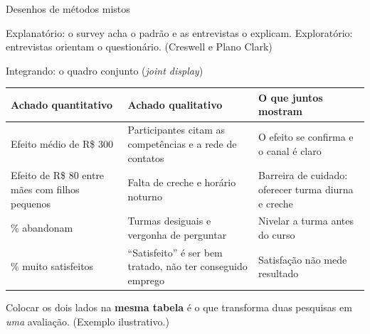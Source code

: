 \begin{frame}{Desenhos de métodos mistos}
  \centering
  \vspace{0.2cm}\par
  \footnotesize Explanatório: o survey acha o padrão e as entrevistas o explicam. Exploratório: entrevistas orientam o questionário. (Creswell e Plano Clark)
\end{frame}

\begin{frame}{Integrando: o quadro conjunto (\textit{joint display})}
  \scriptsize
  \renewcommand{\arraystretch}{1.3}
  \begin{tabularx}{\textwidth}{@{}>{\raggedright\arraybackslash}p{2.6cm}>{\raggedright\arraybackslash}X>{\raggedright\arraybackslash}X@{}}
    \toprule
    \textbf{Achado quantitativo} & \textbf{Achado qualitativo} & \textbf{O que juntos mostram} \\ \midrule
    Efeito médio de R\$ 300 & Participantes citam as competências e a rede de contatos & O efeito se confirma e o canal é claro \\
    Efeito de R\$ 80 entre mães com filhos pequenos & Falta de creche e horário noturno & Barreira de cuidado: oferecer turma diurna e creche \\
    35\% abandonam & Turmas desiguais e vergonha de perguntar & Nivelar a turma antes do curso \\
    80\% muito satisfeitos & ``Satisfeito'' é ser bem tratado, não ter conseguido emprego & Satisfação não mede resultado \\ \bottomrule
  \end{tabularx}
  \vspace{0.2cm}\par
  \small Colocar os dois lados na \textbf{mesma tabela} é o que transforma duas pesquisas em \emph{uma} avaliação. (Exemplo ilustrativo.)
\end{frame}

